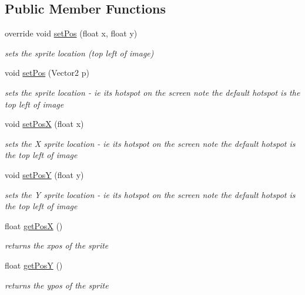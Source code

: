 \subsection*{Public Member Functions}
\begin{DoxyCompactItemize}
\item 
override void \mbox{\hyperlink{class_r_c___framework_1_1_sprite3_parent_aafe2f4e919b30044d02600942068d205}{set\+Pos}} (float x, float y)
\begin{DoxyCompactList}\small\item\em sets the sprite location (top left of image) \end{DoxyCompactList}\item 
void \mbox{\hyperlink{class_r_c___framework_1_1_sprite3_parent_a850bd371ac0c564f36f14e2bf3ada72e}{set\+Pos}} (Vector2 p)
\begin{DoxyCompactList}\small\item\em sets the sprite location -\/ ie its hotspot on the screen note the default hotspot is the top left of image \end{DoxyCompactList}\item 
void \mbox{\hyperlink{class_r_c___framework_1_1_sprite3_parent_ae8cc0fe44090f72c9c9f38826ba0bd3f}{set\+PosX}} (float x)
\begin{DoxyCompactList}\small\item\em sets the X sprite location -\/ ie its hotspot on the screen note the default hotspot is the top left of image \end{DoxyCompactList}\item 
void \mbox{\hyperlink{class_r_c___framework_1_1_sprite3_parent_aacc2ace291d75d78005ab8d3f837a1af}{set\+PosY}} (float y)
\begin{DoxyCompactList}\small\item\em sets the Y sprite location -\/ ie its hotspot on the screen note the default hotspot is the top left of image \end{DoxyCompactList}\item 
float \mbox{\hyperlink{class_r_c___framework_1_1_sprite3_parent_a78aeb4a281abcd3a5cc83fabb4d24a8e}{get\+PosX}} ()
\begin{DoxyCompactList}\small\item\em returns the xpos of the sprite \end{DoxyCompactList}\item 
float \mbox{\hyperlink{class_r_c___framework_1_1_sprite3_parent_afaa8c7fd07554b39dbf6757656cd9065}{get\+PosY}} ()
\begin{DoxyCompactList}\small\item\em returns the ypos of the sprite \end{DoxyCompactList}\item 

\end{DoxyCompactItemize}

